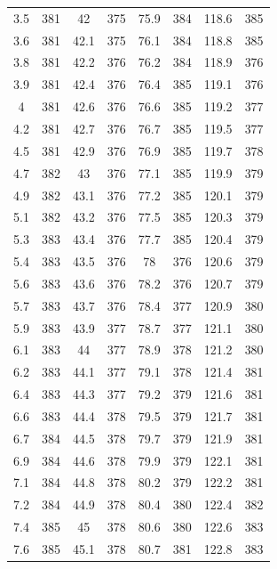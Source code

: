 \documentclass[12pt]{ctexart}
\numberwithin{equation}{section}
\begin{document}
\begin{longtable}{cc|cc|cc|cc}
3.5  &  381  &  42  &  375  &  75.9  &  384  &  118.6  &  385  \\
3.6  &  381  &  42.1  &  375  &  76.1  &  384  &  118.8  &  385  \\
3.8  &  381  &  42.2  &  376  &  76.2  &  384  &  118.9  &  376  \\
3.9  &  381  &  42.4  &  376  &  76.4  &  385  &  119.1  &  376  \\
4  &  381  &  42.6  &  376  &  76.6  &  385  &  119.2  &  377  \\
4.2  &  381  &  42.7  &  376  &  76.7  &  385  &  119.5  &  377  \\
4.5  &  381  &  42.9  &  376  &  76.9  &  385  &  119.7  &  378  \\
4.7  &  382  &  43  &  376  &  77.1  &  385  &  119.9  &  379  \\
4.9  &  382  &  43.1  &  376  &  77.2  &  385  &  120.1  &  379  \\
5.1  &  382  &  43.2  &  376  &  77.5  &  385  &  120.3  &  379  \\
5.3  &  383  &  43.4  &  376  &  77.7  &  385  &  120.4  &  379  \\
5.4  &  383  &  43.5  &  376  &  78  &  376  &  120.6  &  379  \\
5.6  &  383  &  43.6  &  376  &  78.2  &  376  &  120.7  &  379  \\
5.7  &  383  &  43.7  &  376  &  78.4  &  377  &  120.9  &  380  \\
5.9  &  383  &  43.9  &  377  &  78.7  &  377  &  121.1  &  380  \\
6.1  &  383  &  44  &  377  &  78.9  &  378  &  121.2  &  380  \\
6.2  &  383  &  44.1  &  377  &  79.1  &  378  &  121.4  &  381  \\
6.4  &  383  &  44.3  &  377  &  79.2  &  379  &  121.6  &  381  \\
6.6  &  383  &  44.4  &  378  &  79.5  &  379  &  121.7  &  381  \\
6.7  &  384  &  44.5  &  378  &  79.7  &  379  &  121.9  &  381  \\
6.9  &  384  &  44.6  &  378  &  79.9  &  379  &  122.1  &  381  \\
7.1  &  384  &  44.8  &  378  &  80.2  &  379  &  122.2  &  381  \\
7.2  &  384  &  44.9  &  378  &  80.4  &  380  &  122.4  &  382  \\
7.4  &  385  &  45  &  378  &  80.6  &  380  &  122.6  &  383  \\
7.6  &  385  &  45.1  &  378  &  80.7  &  381  &  122.8  &  383  \\

\end{longtable}
\end{document}
